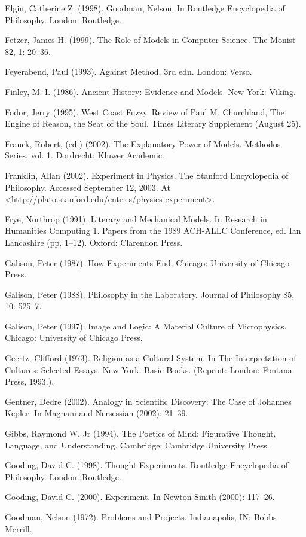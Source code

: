 Elgin, Catherine Z. (1998). Goodman, Nelson. In Routledge Encyclopedia of Philosophy. London: Routledge.

Fetzer, James H. (1999). The Role of Models in Computer Science. The Monist 82, 1: 20–36.

Feyerabend, Paul (1993). Against Method, 3rd edn. London: Verso.

Finley, M. I. (1986). Ancient History: Evidence and Models. New York: Viking.

Fodor, Jerry (1995). West Coast Fuzzy. Review of Paul M. Churchland, The Engine of Reason, the Seat of the Soul. Times Literary Supplement (August 25).

Franck, Robert, (ed.) (2002). The Explanatory Power of Models. Methodos Series, vol. 1. Dordrecht: Kluwer Academic.

Franklin, Allan (2002). Experiment in Physics. The Stanford Encyclopedia of Philosophy. Accessed September 12, 2003. At <http://plato.stanford.edu/entries/physics-experiment>.

Frye, Northrop (1991). Literary and Mechanical Models. In Research in Humanities Computing 1. Papers from the 1989 ACH-ALLC Conference, ed. Ian Lancashire (pp. 1–12). Oxford: Clarendon Press.

Galison, Peter (1987). How Experiments End. Chicago: University of Chicago Press.

Galison, Peter (1988). Philosophy in the Laboratory. Journal of Philosophy 85, 10: 525–7.

Galison, Peter (1997). Image and Logic: A Material Culture of Microphysics. Chicago: University of Chicago Press.

Geertz, Clifford (1973). Religion as a Cultural System. In The Interpretation of Cultures: Selected Essays. New York: Basic Books. (Reprint: London: Fontana Press, 1993.).

Gentner, Dedre (2002). Analogy in Scientific Discovery: The Case of Johannes Kepler. In Magnani and Nersessian (2002): 21–39.

Gibbs, Raymond W, Jr (1994). The Poetics of Mind: Figurative Thought, Language, and Understanding. Cambridge: Cambridge University Press.

Gooding, David C. (1998). Thought Experiments. Routledge Encyclopedia of Philosophy. London: Routledge.

Gooding, David C. (2000). Experiment. In Newton-Smith (2000): 117–26.

Goodman, Nelson (1972). Problems and Projects. Indianapolis, IN: Bobbs-Merrill.

